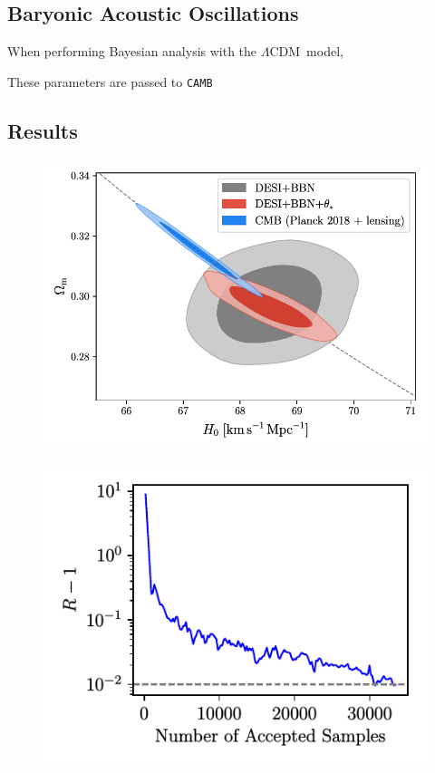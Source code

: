 \documentclass{lkx_paper}
\newcommand{\LCDM}{$\Lambda\mathrm{CDM}$~}
\begin{document}
\subsection*{Baryonic Acoustic Oscillations}




When performing Bayesian analysis with the \LCDM model, 

These parameters are passed to \texttt{CAMB} \cite{Lewis:1999bs}

\subsection*{Results}


\begin{figure}[H]
  \centering
  \includegraphics[scale=0.8]{figures/H0-omegam.pdf}
  \caption{}
\end{figure}

\begin{figure}[H]
  \centering
  \includegraphics{figures/CMB-R-1.pdf}
  \caption{}
\end{figure}
\end{document}
